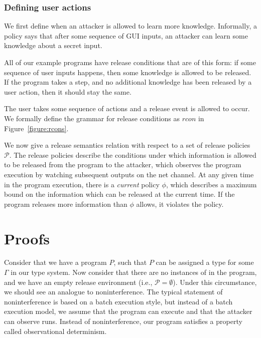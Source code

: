 \documentclass[conference]{IEEEtran}
\newcommand{\code}[1]{\text{\lstinline!#1!}}
\theoremstyle{definition}
\newcommand{\pset}{\ensuremath{\mathcal{P}}}
\begin{document}
\subsubsection{Defining user actions}

We first define when an attacker is allowed to learn more knowledge.
Informally, a policy says that after some sequence of GUI inputs, an
attacker can learn some knowledge about a secret input.

All of our example programs have release conditions that are of this
form: if some sequence of user inputs happens, then some knowledge is
allowed to be released.  If the program takes a step, and no
additional knowledge has been released by a user action, then it
should stay the same.

The user takes some sequence of actions and a release event is allowed
to occur.  We formally define the grammar for release conditions as
$rcon$ in Figure~\ref{figure:rcons}.



We now give a release semantics relation with respect to a set of
release policies $\pset$.  The release policies describe the
conditions under which information is allowed to be released from the
program to the attacker, which observes the program execution by
watching subsequent outputs on the net channel.  At any given time in
the program execution, there is a \emph{current} policy $\phi$, which
describes a maximum bound on the information which can be released at
the current time.  If the program releases more information than
$\phi$ allows, it violates the policy.


\section{Proofs}

Consider that we have a program $P$, such that $P$ can be assigned a
type for some $\Gamma$ in our type system.  Now consider that there
are no instances of \code{declassify} in the program, and we have an
empty release environment (i.e., $\pset = \emptyset$).  Under this
circumstance, we should see an analogue to noninterference.  The
typical statement of noninterference is based on a batch execution
style, but instead of a batch execution model, we assume that the
program can execute and that the attacker can observe runs.  Instead
of noninterference, our program satisfies a property called
observational determinism.
\end{document}
